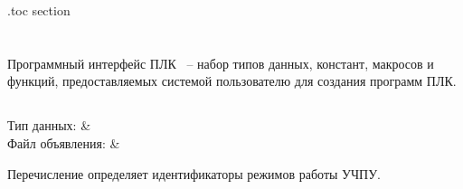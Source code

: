 \etocsettocdepth.toc {section}

\renewcommand{\arraystretch}{1.0} %
\renewcommand{\tabcolsep}{0.1cm}   %

\chapter{}
\label{sec:Functions}

Программный интерфейс ПЛК ~-- набор типов данных, констант, макросов и функций, предоставляемых системой пользователю для создания программ ПЛК. 
\section{}

\subsection{}

\subsubsection{}
\label{sec:CNCMode}

\begin{fHeader}
    Тип данных:            & \\
    Файл объявления:             &  \\
\end{fHeader}

Перечисление определяет идентификаторы режимов работы УЧПУ.

